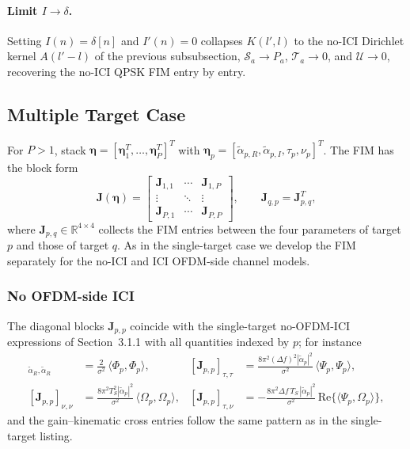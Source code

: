 \documentclass[11pt]{article}
\begin{document}
\paragraph{Limit \(I\to\delta\).} Setting \(I(n) = \delta[n]\) and
\(I'(n) = 0\) collapses \(K(l',l)\) to the no-ICI Dirichlet kernel
\(A(l'-l)\) of the previous subsubsection, \(\mathcal{S}_a\to P_a\),
\(\mathcal{T}_a\to 0\), and \(\mathcal{U}\to 0\), recovering the no-ICI
QPSK FIM entry by entry.

\subsection{Multiple Target Case}

For \(P>1\), stack
\(\bm{\eta} = [\bm{\eta}_1^T,\ldots,\bm{\eta}_P^T]^T\) with
\(\bm{\eta}_p = [\tilde{\alpha}_{p,R}, \tilde{\alpha}_{p,I}, \tau_p, \nu_p]^T\).
The FIM has the block form
\begin{equation}
    \bm{J}(\bm{\eta}) = \begin{bmatrix}
        \bm{J}_{1,1} & \cdots & \bm{J}_{1,P} \\
        \vdots & \ddots & \vdots \\
        \bm{J}_{P,1} & \cdots & \bm{J}_{P,P}
    \end{bmatrix},
    \qquad \bm{J}_{q,p} = \bm{J}_{p,q}^T,
\end{equation}
where \(\bm{J}_{p,q}\in\mathbb{R}^{4\times 4}\) collects the FIM entries
between the four parameters of target \(p\) and those of target \(q\).
As in the single-target case we develop the FIM separately for the
no-ICI and ICI OFDM-side channel models.

\subsubsection{No OFDM-side ICI}

The diagonal blocks \(\bm{J}_{p,p}\) coincide with the single-target
no-OFDM-ICI expressions of Section~3.1.1 with all quantities indexed
by \(p\); for instance
\begin{align}
    [\bm{J}_{p,p}]_{\tilde{\alpha}_R,\tilde{\alpha}_R} &= \tfrac{2}{\sigma^2}\,
        \langle \Phi_p,\Phi_p\rangle, &
    [\bm{J}_{p,p}]_{\tau,\tau} &= \tfrac{8\pi^2 (\Delta f)^2 |\tilde{\alpha}_p|^2}{\sigma^2}\,
        \langle \Psi_p,\Psi_p\rangle, \\
    [\bm{J}_{p,p}]_{\nu,\nu} &= \tfrac{8\pi^2 T_S^2 |\tilde{\alpha}_p|^2}{\sigma^2}\,
        \langle \Omega_p,\Omega_p\rangle, &
    [\bm{J}_{p,p}]_{\tau,\nu} &= -\tfrac{8\pi^2 \Delta f\, T_S\, |\tilde{\alpha}_p|^2}{\sigma^2}\,
        \text{Re}\{\langle \Psi_p,\Omega_p\rangle\},
\end{align}
and the gain--kinematic cross entries follow the same pattern as in the
single-target listing.
\end{document}

